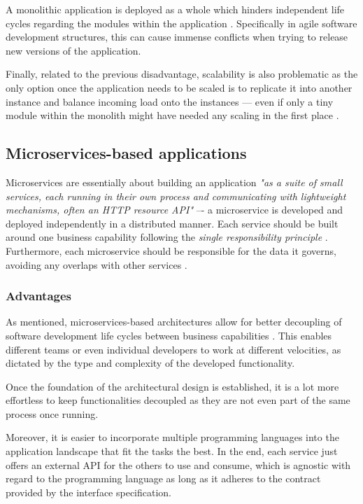 \documentclass[12pt,a4paper]{report}
\begin{document}
A monolithic application is deployed as a whole which hinders
independent life cycles regarding the modules within the application \cite{ms-fowler}.
Specifically in agile software development structures, this can cause
immense conflicts when trying to release new versions of the application.

Finally, related to the previous disadvantage, scalability is also problematic
as the only option once the application needs to be scaled is to replicate it
into another instance and balance incoming load onto the instances --- even if
only a tiny module within the monolith might have needed any scaling in the
first place \cite{ms-fowler, newman2015building}.


\subsection{Microservices\hyp based applications}

Microservices are essentially about building an application \textit{"as a suite
of small services, each running in their own process and communicating with
lightweight mechanisms, often an HTTP resource API"} \cite{ms-fowler} --\hyp
a microservice is developed and deployed independently in a distributed manner.
Each service should be built around one business capability following the
\textit{single responsibility principle} \cite{newman2015building,
martin2003agile}. Furthermore, each microservice should be responsible for the
data it governs, avoiding any overlaps with other services \cite{ms-fowler}.


\subsubsection{Advantages}
As mentioned, microservices\hyp based
architectures allow for better decoupling of software development life cycles
between business capabilities \cite{ms-fowler}. This enables different teams or
even individual developers to work at different velocities,
as dictated by the type and complexity of the developed functionality.

Once the foundation of the architectural design is established,
it is a lot more effortless to keep functionalities decoupled as they are not
even part of the same process once running.

Moreover, it is easier to incorporate multiple programming languages into the
application landscape that fit the tasks the best. In the end, each service
just offers an external API for the others to use and consume, which is
agnostic with regard to the programming language as long as it adheres
to the contract provided by the interface specification.
\end{document}

